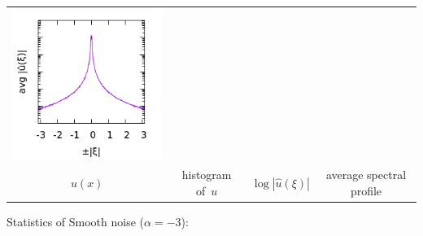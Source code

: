 \begin{tabular}{cccc}
	\includegraphics{KK-2_p.png} \\
	$u(x)$ &
	histogram of~$u$ &
	$\log|\hat u(\xi)|$ &
	average spectral profile
\end{tabular}

Statistics of Smooth noise ($\alpha=-3$):

